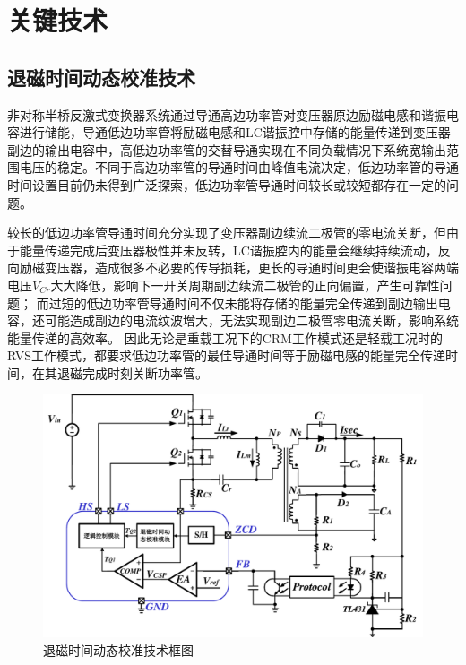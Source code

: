 

\section{关键技术}

\subsection{退磁时间动态校准技术}
\label{sec:退磁时间动态校准技术}

非对称半桥反激式变换器系统通过导通高边功率管对变压器原边励磁电感和谐振电容进行储能，导通低边功率管将励磁电感和LC谐振腔中存储的能量传递到变压器副边的输出电容中，高低边功率管的交替导通实现在不同负载情况下系统宽输出范围电压的稳定。不同于高边功率管的导通时间由峰值电流决定，低边功率管的导通时间设置目前仍未得到广泛探索，低边功率管导通时间较长或较短都存在一定的问题。

较长的低边功率管导通时间充分实现了变压器副边续流二极管的零电流关断，但由于能量传递完成后变压器极性并未反转，LC谐振腔内的能量会继续持续流动，反向励磁变压器，造成很多不必要的传导损耗，更长的导通时间更会使谐振电容两端电压$V_{Cr}$大大降低，影响下一开关周期副边续流二极管的正向偏置，产生可靠性问题；
而过短的低边功率管导通时间不仅未能将存储的能量完全传递到副边输出电容，还可能造成副边的电流纹波增大，无法实现副边二极管零电流关断，影响系统能量传递的高效率。
因此无论是重载工况下的CRM工作模式还是轻载工况时的RVS工作模式，都要求低边功率管的最佳导通时间等于励磁电感的能量完全传递时间，在其退磁完成时刻关断功率管。

\begin{figure}[htbp] 
    \centering
    \includegraphics[width=0.8\linewidth]{figures/退磁时间动态校准图.pdf}
    \caption{退磁时间动态校准技术框图}
    \label{fig:退磁时间1}
\end{figure}

